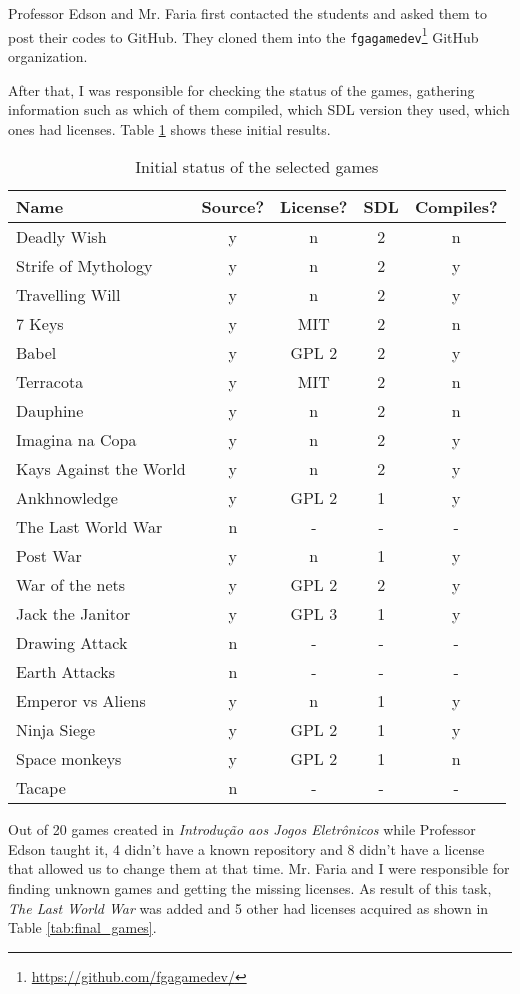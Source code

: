 Professor Edson and Mr. Faria first contacted the students and asked them to post their codes to GitHub. They cloned them into the \texttt{fgagamedev}\footnote{ \href{https://github.com/fgagamedev}{https://github.com/fgagamedev/} } GitHub organization.

After that, I was responsible for checking the status of the games, gathering information such as which of them compiled, which SDL version they used, which ones had licenses. Table \ref{tab:first_games} shows these initial results.


\begin{table}[h!]
\centering
\caption{Initial status of the selected games}
\label{tab:first_games}
\begin{tabular}{lcccc}
\toprule
\textbf{Name} & \textbf{Source?} & \textbf{License?} & \textbf{SDL} & \textbf{Compiles?} \\
\midrule
Deadly Wish & y & n & 2 & n \\
Strife of Mythology & y & n & 2 & y \\
Travelling Will & y & n & 2 & y \\
7 Keys & y & MIT & 2 & n \\
Babel & y & GPL 2 & 2 & y \\
Terracota & y & MIT & 2 & n \\
Dauphine & y & n & 2 & n \\
Imagina na Copa & y & n & 2 & y \\
Kays Against the World & y & n & 2 & y \\
Ankhnowledge & y & GPL 2 & 1 & y \\
The Last World War & n & - & - & - \\
Post War & y & n & 1 & y \\
War of the nets & y & GPL 2 & 2 & y \\
Jack the Janitor & y & GPL 3 & 1 & y \\
Drawing Attack & n & - & - & - \\
Earth Attacks & n & - & - & - \\
Emperor vs Aliens & y & n & 1 & y \\
Ninja Siege & y & GPL 2 & 1 & y \\
Space monkeys & y & GPL 2 & 1 & n \\
Tacape & n & - & - & - \\
\bottomrule
\end{tabular}
\end{table}

Out of 20 games created in \textit{Introdu\c{c}\~ao aos Jogos Eletr\^onicos} while Professor Edson taught it, 4 didn't have a known repository and 8 didn't have a license that allowed us to change them at that time. Mr. Faria and I were responsible for finding unknown games and getting the missing licenses. As result of this task, \textit{The Last World War} was added and 5 other had licenses acquired as shown in Table \ref{tab:final_games}.

